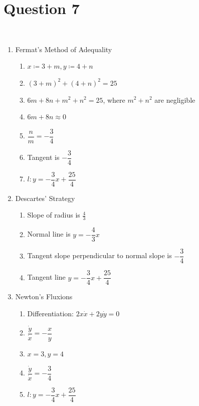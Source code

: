 \documentclass{article}
\begin{document}
\section*{Question 7}

~

\begin{enumerate}
    \item Fermat’s Method of Adequality
    \begin{enumerate}
        \item $x\coloneqq 3+m, y\coloneqq 4+n$
        \item $(3+m)^2+(4+n)^2=25$
        \item $6m+8n+m^2+n^2=25$, where $m^2+n^2$ are negligible
        \item $6m+8n\approx 0$
        \item $\dfrac{n}{m}=-\dfrac{3}{4}$
        \item Tangent is $-\dfrac{3}{4}$
        \item $l: y=-\dfrac{3}{4}x+\dfrac{25}{4}$
    \end{enumerate}
    \item Descartes’ Strategy
    \begin{enumerate}
        \item Slope of radius is $\frac{4}{3}$
        \item Normal line is $y=-\dfrac{4}{3}x$
        \item Tangent slope perpendicular to normal slope is $-\dfrac{3}{4}$
        \item Tangent line $y=-\dfrac{3}{4}x+\dfrac{25}{4}$
    \end{enumerate}
    \item Newton’s Fluxions
    \begin{enumerate}
        \item Differentiation: $2x\dot{x}+2y\dot{y}=0$
        \item $\dfrac{\dot{y}}{\dot{x}}=-\dfrac{x}{y}$
        \item $x=3,y=4$
        \item $\dfrac{\dot{y}}{\dot{x}}=-\dfrac{3}{4}$
        \item $l: y=-\dfrac{3}{4}x+\dfrac{25}{4}$
    \end{enumerate}
\end{enumerate}
\end{document}
